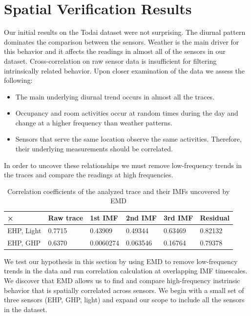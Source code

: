 
\section{Spatial Verification Results}

Our initial results on the Todai dataset were not surprising.  The diurnal pattern dominates the comparison between the sensors.
Weather is the main driver for this behavior and it affects the readings in almost all of the
sensors in our dataset.  Cross-correlation on raw sensor data is insufficient for filtering intrinsically related
behavior.  Upon closer examination of the data we assess the following:

\begin{itemize}
\item The main underlying diurnal trend occurs in almost all the traces.
\item Occupancy and room activities occur at random times during the day and change 
		at a higher frequency than weather patterns.
\item Sensors that serve the same location observe the same activities.  Therefore, their underlying
		measurements should be correlated.
\end{itemize}

In order to uncover these relationships we must remove low-frequency trends in the traces and
compare the readings at high frequencies.

\begin{table}
\begin{center}
\begin{tabular}{|l|l|l|l|l|l|}
\hline
× & Raw trace & 1st IMF & 2nd IMF & 3rd IMF & Residual\\ \hline
EHP, Light & 0.7715 & 0.43909 & 0.49344 & 0.63469 & 0.82132 \\ \hline
EHP, GHP & 0.6370 & 0.0060274 & 0.063546 & 0.16764 & 0.79378 \\ \hline
\end{tabular}
\caption{Correlation coefficients of the analyzed trace and their IMFs uncovered by EMD}
\label{tab:corr}
\end{center}
\end{table}


We test our hypothesis in this section by using EMD to remove low-frequency trends in the data
and run correlation calculation at overlapping IMF timescales.  We discover that EMD allows us
to find and compare high-frequency instrinsic behavior that is spatially correlated across
sensors.  We begin with a small set of three sensors (EHP, GHP, light) and expand our scope
to include all the sensors in the dataset.







